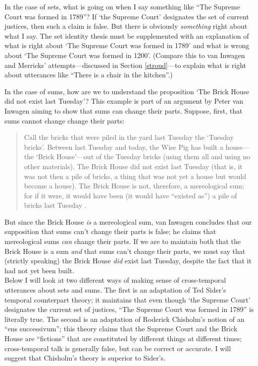 \documentclass[12pt,twoside]{reedfancy}
\begin{document}
\begin{spacing}{1.25}
In the case of sets, what is going on when I say something like ``The
Supreme Court was formed in 1789''?  If `the Supreme Court' designates
the set of current justices, then such a claim is false.  But there is
obviously {\em something} right about what I say.  The set identity
thesis must be supplemented with an explanation of what is right about
`The Supreme Court was formed in 1789' and what is wrong about `The
Supreme Court was formed in 1200'.  (Compare this to van Inwagen and
Merricks' attempts---discussed in Section \ref{stroud}---to explain
what is right about utterances like ``There is a chair in the
kitchen''.)

In the case of sums, how are we to understand the proposition `The
Brick House did not exist last Tuesday'?  This example is part of an
argument by Peter van Inwagen aiming to show that sums can change
their parts.  Suppose, first, that sums cannot change change their
parts:

\begin{quote}
Call the bricks that were piled in the yard last Tuesday the `Tuesday
bricks'.  Between last Tuesday and today, the Wise Pig has built a
house---the `Brick House'---out of the Tuesday bricks (using them all
and using no other materials).  The Brick House did not exist last
Tuesday (that is, it was not then a pile of bricks, a thing that was
not yet a house but would become a house).  The Brick House is not,
therefore, a mereological sum; for if it were, it would have been (it
would have ``existed as'') a pile of bricks last Tuesday
\citeyearpar[616]{inwagen2006}.
\end{quote}

But since the Brick House {\em is} a mereological sum, van Inwagen
concludes that our supposition that sums can't change their parts is
false; he claims that mereological sums {\em can} change their parts.
If we are to maintain both that the Brick House is a sum {\em and}
that sums can't change their parts, we must say that (strictly
speaking) the Brick House {\em did} exist last Tuesday, despite the
fact that it had not yet been built. \\

Below I will look at two different ways of making sense of
cross-temporal utterances about sets and sums.  The first is an
adaptation of Ted Sider's temporal counterpart theory; it maintains
that even though `the Supreme Court' designates the current set of
justices, ``The Supreme Court was formed in 1789'' is literally true.
The second is an adaptation of Roderick Chisholm's notion of an ``ens
successivum''; this theory claims that the Supreme Court and the Brick
House are ``fictions'' that are constituted by different things at
different times; cross-temporal talk is generally false, but can be
correct or accurate.  I will suggest that Chisholm's theory is
superior to Sider's.


\end{spacing}
\end{document}
